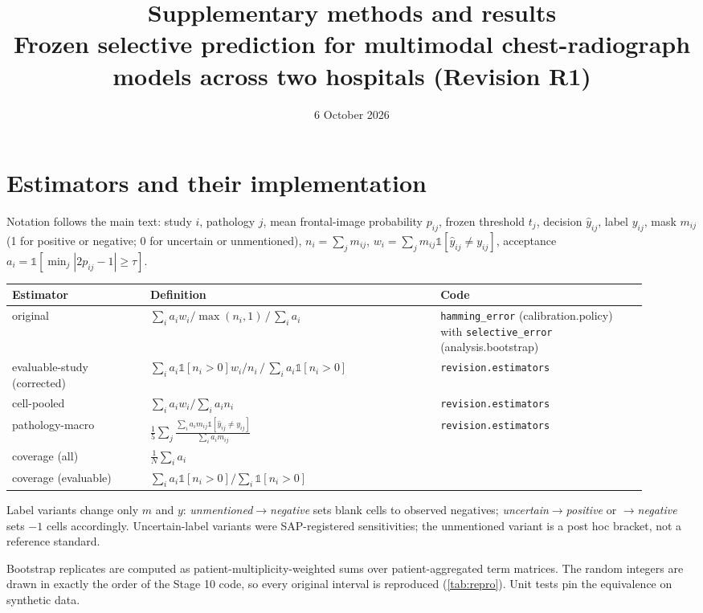 \documentclass[10pt,a4paper]{article}
\title{Supplementary methods and results\\[2pt]\large Frozen selective prediction
for multimodal chest-radiograph models across two hospitals (Revision R1)}
\author{}
\date{6 October 2026}
\begin{document}
\maketitle
\tableofcontents

\section{Estimators and their implementation}
Notation follows the main text: study $i$, pathology $j$, mean frontal-image
probability $p_{ij}$, frozen threshold $t_j$, decision $\hat y_{ij}$, label
$y_{ij}$, mask $m_{ij}$ (1 for positive or negative; 0 for uncertain or
unmentioned), $n_i=\sum_jm_{ij}$, $w_i=\sum_jm_{ij}\mathbb{1}[\hat y_{ij}\neq y_{ij}]$,
acceptance $a_i=\mathbb{1}[\min_j|2p_{ij}-1|\ge\tau]$.
\begin{center}\small
\begin{tabular}{p{0.2\linewidth}p{0.42\linewidth}p{0.3\linewidth}}
\toprule
Estimator & Definition & Code\\
\midrule
original & $\sum_i a_i w_i/\max(n_i,1)\,/\,\sum_i a_i$ & \texttt{hamming\_error} (calibration.policy) with \texttt{selective\_error} (analysis.bootstrap)\\
evaluable-study (corrected) & $\sum_i a_i\mathbb{1}[n_i>0]w_i/n_i\,/\,\sum_i a_i\mathbb{1}[n_i>0]$ & \texttt{revision.estimators}\\
cell-pooled & $\sum_i a_iw_i/\sum_ia_in_i$ & \texttt{revision.estimators}\\
pathology-macro & $\frac15\sum_j\frac{\sum_ia_im_{ij}\mathbb{1}[\hat y_{ij}\ne y_{ij}]}{\sum_ia_im_{ij}}$ & \texttt{revision.estimators}\\
coverage (all) & $\frac1N\sum_ia_i$ & \\
coverage (evaluable) & $\sum_ia_i\mathbb{1}[n_i>0]/\sum_i\mathbb{1}[n_i>0]$ & \\
\bottomrule
\end{tabular}
\end{center}
Label variants change only $m$ and $y$: \emph{unmentioned$\to$negative} sets blank
cells to observed negatives; \emph{uncertain$\to$positive} or
\emph{$\to$negative} sets $-1$ cells accordingly. Uncertain-label variants were
SAP-registered sensitivities; the unmentioned variant is a post hoc bracket,
not a reference standard.

Bootstrap replicates are computed as patient-multiplicity-weighted sums over
patient-aggregated term matrices. The random integers are drawn in exactly the
order of the Stage 10 code, so every original interval is reproduced
(\cref{tab:repro}). Unit tests pin the equivalence on synthetic data.
\end{document}
